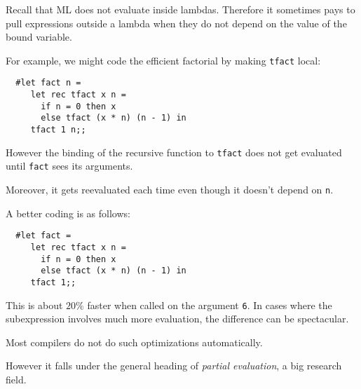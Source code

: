 \begin{slide*}


\vspace*{0.5cm}

Recall that ML does not evaluate inside lambdas. Therefore it sometimes pays to
pull expressions outside a lambda when they do not depend on the value of the
bound variable.

For example, we might code the efficient factorial by making {\black \tt tfact}
local:

\begin{black}\begin{verbatim}
  #let fact n =
     let rec tfact x n =
       if n = 0 then x
       else tfact (x * n) (n - 1) in
     tfact 1 n;;
\end{verbatim}\end{black}

However the binding of the recursive function to {\black \tt tfact} does not
get evaluated until {\black \tt fact} sees its arguments.

Moreover, it gets reevaluated each time even though it doesn't depend on
{\black \tt n}.

\end{slide*}



\begin{slide*}


\vspace*{0.5cm}

A better coding is as follows:

\begin{black}\begin{verbatim}
  #let fact =
     let rec tfact x n =
       if n = 0 then x
       else tfact (x * n) (n - 1) in
     tfact 1;;
\end{verbatim}\end{black}

This is about $20 \%$ faster when called on the argument {\black \tt 6}. In
cases where the subexpression involves much more evaluation, the difference can
be spectacular.

Most compilers do not do such optimizations automatically.

However it falls under the general heading of {\em partial evaluation}, a big
research field.

\end{slide*}




